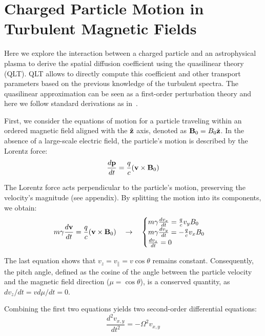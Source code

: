 \section{Charged Particle Motion in Turbulent Magnetic Fields}
\label{sec:qlt}

Here we explore the interaction between a charged particle and an astrophysical plasma to derive the spatial diffusion coefficient using the quasilinear theory (QLT). 
%
QLT allows to directly compute this coefficient and other transport parameters based on the previous knowledge of the turbulent spectra.
%
The quasilinear approximation can be seen as a first-order perturbation theory and here we follow standard derivations as in~\cite{Blandford1987pr,Shalchi2009book,Blasi2013aar}.

First, we consider the equations of motion for a particle traveling within an ordered magnetic field aligned with the $\hat{\vb z}$ axis, denoted as $\vb B_0 = B_0 \hat{\vb z}$. In the absence of a large-scale electric field, the particle's motion is described by the Lorentz force:
%
\begin{equation}
\frac{d \vb p}{dt} = \frac{q}{c} (\vb v \times \vb B_0)
\label{eq:lorentz}
\end{equation}

The Lorentz force acts perpendicular to the particle's motion, preserving the velocity's magnitude (see appendix). By splitting the motion into its components, we obtain:
%
\begin{equation}
m \gamma \frac{d \vb v}{dt} = \frac{q}{c} (\vb v \times \vb B_0) \quad \rightarrow \quad 
\begin{cases}
m \gamma \frac{dv_x}{dt} = \frac{q}{c} v_y B_0 \\
m \gamma \frac{dv_y}{dt} = -\frac{q}{c} v_x B_0\\
\frac{dv_z}{dt} = 0
\end{cases}
\label{eq:lorentzcomponents}
\end{equation}

The last equation shows that $v_z = v_\| = v \cos \theta$ remains constant. Consequently, the pitch angle, defined as the cosine of the angle between the particle velocity and the magnetic field direction ($\mu = \cos \theta$), is a conserved quantity, as $dv_z/dt = v d\mu/dt = 0$.

Combining the first two equations yields two second-order differential equations:
%
\begin{equation}
\frac{d^2 v_{x,y}}{dt^2} = - \Omega^2 v_{x,y}
\end{equation}


